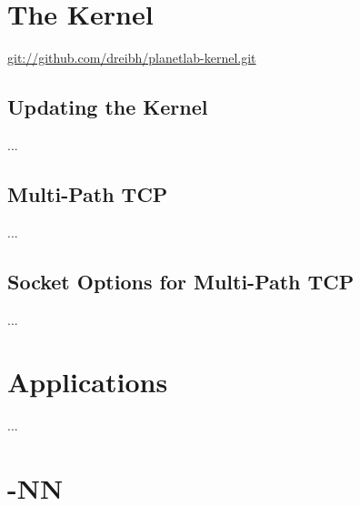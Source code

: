 \section{The Kernel}

\url{git://github.com/dreibh/planetlab-kernel.git}

\subsection{Updating the Kernel}

...

\subsection{Multi-Path TCP}

...

\subsection{Socket Options for Multi-Path TCP}

...



\section{Applications}

...

\section{-NN}

